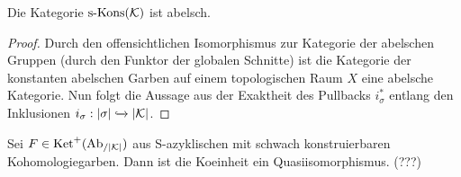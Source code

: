 \begin{lemma}
  Die Kategorie $\operatorname{s-Kons}(\mathcal{K})$ ist abelsch.
\end{lemma}
\begin{proof}
  Durch den offensichtlichen Isomorphismus zur Kategorie der abelschen
  Gruppen (durch den Funktor der globalen Schnitte) ist die Kategorie
  der konstanten abelschen Garben auf einem topologischen Raum $X$
  eine abelsche Kategorie. Nun folgt die Aussage aus der Exaktheit des
  Pullbacks $i_{\sigma}^*$ entlang den Inklusionen $i_{\sigma}:
  |\sigma| \xhookrightarrow{} |\mathcal{K}|$.
\end{proof}

\begin{prop}
  Sei $F \in \operatorname{Ket}^+(\operatorname{Ab}_{/|\mathcal{K}|})$ aus S-azyklischen mit schwach konstruierbaren Kohomologiegarben. Dann ist die Koeinheit ein Quasiisomorphismus. (???)
\end{prop}



